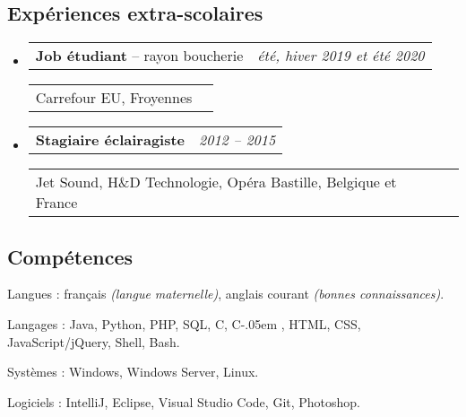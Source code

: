 \documentclass[10pt,a4paper]{article}
\makeatletter
\newcommand{\Csharp}{%
  {\settoheight{\dimen0}{C}C\kern-.05em \resizebox{!}{\dimen0}{\raisebox{\depth}{\#}}}}
\newenvironment{indentsection}[1]
{\begin{list}{}
  {\setlength{\leftmargin}{#1}} \item[]
}
{\end{list}}
\newcommand{\headerrow}[2]
{\begin{tabular*}{\linewidth}{l@{\extracolsep{\fill}}r}
  #1 &
  #2 \\
\end{tabular*}}
\makeatother
\begin{document}
\subsection*{Expériences extra-scolaires}
\begin{itemize}
  \parskip=0.1em

  \item
  \headerrow
    {\textbf{Job étudiant} -- rayon boucherie}
    {\emph{été, hiver 2019 et été 2020}}
  \headerrow
    {{Carrefour EU, Froyennes}}
    {\emph{}}
  \item
  \headerrow
    {\textbf{Stagiaire éclairagiste}}
    {\emph{2012 -- 2015}}
  \headerrow
    {{Jet Sound, H\&D Technologie, Opéra Bastille, Belgique et France}}
    {\emph{}}
\end{itemize}


\vspace{-0.4em}
\subsection*{Compétences}
\begin{indentsection}{\parindent}
\begin{description*}
  \item[Langues :]
  français \emph{(langue maternelle)}, %
  anglais courant \emph{(bonnes connaissances)}.
 \item[Langages :] Java, Python, PHP, SQL, C, \Csharp, HTML,
  CSS,  JavaScript/jQuery, Shell, Bash.
  \item[Systèmes :] Windows, Windows Server, Linux.
  \item[Logiciels :] IntelliJ, Eclipse, Visual Studio Code, Git, Photoshop.
\end{description*}
\end{indentsection}
\end{document}
